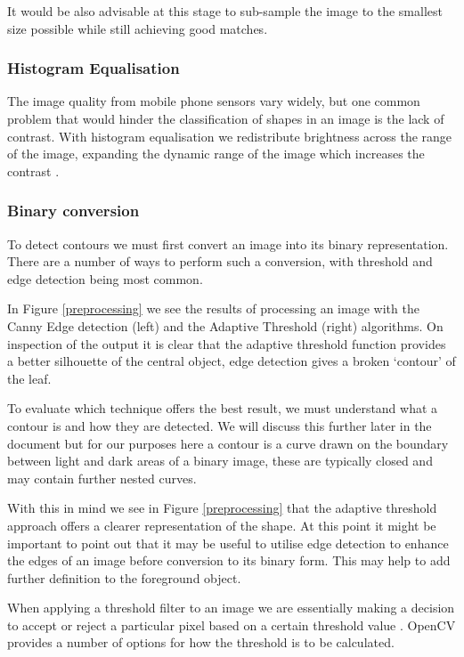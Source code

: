 It would be also advisable at this stage to sub-sample the image to the smallest size possible while still achieving good matches.

\subsubsection{Histogram Equalisation}
The image quality from mobile phone sensors vary widely, but one common problem that would hinder the classification of shapes in an image is the lack of contrast. With histogram equalisation we redistribute brightness across the range of the image, expanding the dynamic range of the image which increases the contrast \cite{kuntz09}.


\subsubsection{Binary conversion}
To detect contours we must first convert an image into its binary representation. There are a number of ways to perform such a conversion, with threshold and edge detection being most common.

In Figure \ref{preprocessing} we see the results of processing an image with the Canny Edge detection (left) and the Adaptive Threshold (right) algorithms. On inspection of the output it is clear that the adaptive threshold function provides a better silhouette of the central object, edge detection gives a broken ‘contour’ of the leaf. 

To evaluate which technique offers the best result, we must understand what a contour is and how they are detected. We will discuss this further later in the document but for our purposes here a contour is a curve drawn on the boundary between light and dark areas of a binary image, these are typically closed and may contain further nested curves.

With this in mind we see in Figure \ref{preprocessing} that the adaptive threshold approach offers a clearer representation of the shape. At this point it might be important to point out that it may be useful to utilise edge detection to enhance the edges of an image before conversion to its binary form. This may help to add further definition to the foreground object.

When applying a threshold filter to an image we are essentially making a decision to accept or reject a particular pixel based on a certain threshold value \cite{bradski08}. OpenCV provides a number of options for how the threshold is to be calculated.

